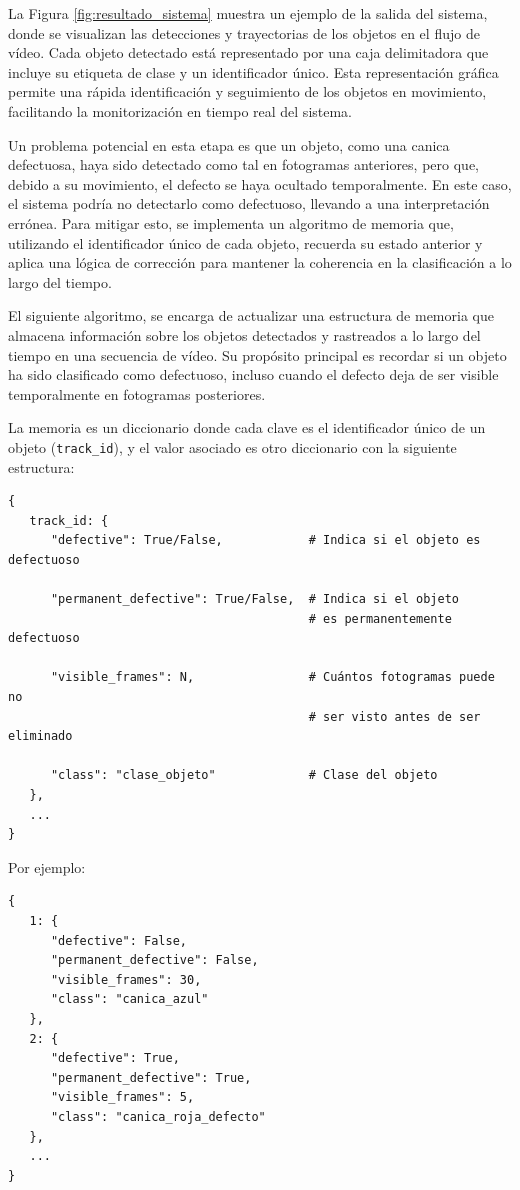 \documentclass[11pt,spanish,listoffigures,listoftables]{tfgetsinf}
\begin{document}
La Figura \ref{fig:resultado_sistema} muestra un ejemplo de la salida del sistema, donde se visualizan las detecciones y trayectorias de los objetos en el flujo de vídeo. Cada objeto detectado está representado por una caja delimitadora que incluye su etiqueta de clase y un identificador único. Esta representación gráfica permite una rápida identificación y seguimiento de los objetos en movimiento, facilitando la monitorización en tiempo real del sistema.

Un problema potencial en esta etapa es que un objeto, como una canica defectuosa, haya sido detectado como tal en fotogramas anteriores, pero que, debido a su movimiento, el defecto se haya ocultado temporalmente. En este caso, el sistema podría no detectarlo como defectuoso, llevando a una interpretación errónea. Para mitigar esto, se implementa un algoritmo de memoria que, utilizando el identificador único de cada objeto, recuerda su estado anterior y aplica una lógica de corrección para mantener la coherencia en la clasificación a lo largo del tiempo.

El siguiente algoritmo, se encarga de actualizar una estructura de memoria que almacena información sobre los objetos detectados y rastreados a lo largo del tiempo en una secuencia de vídeo. Su propósito principal es recordar si un objeto ha sido clasificado como defectuoso, incluso cuando el defecto deja de ser visible temporalmente en fotogramas posteriores.


La memoria es un diccionario donde cada clave es el identificador único de un objeto (\texttt{track\_id}), y el valor asociado es otro diccionario con la siguiente estructura:

\begin{verbatim}
{
   track_id: {
      "defective": True/False,            # Indica si el objeto es defectuoso

      "permanent_defective": True/False,  # Indica si el objeto 
                                          # es permanentemente defectuoso

      "visible_frames": N,                # Cuántos fotogramas puede no 
                                          # ser visto antes de ser eliminado

      "class": "clase_objeto"             # Clase del objeto
   },
   ...
}
\end{verbatim}

Por ejemplo:
\begin{verbatim}
{
   1: {
      "defective": False,
      "permanent_defective": False,
      "visible_frames": 30,
      "class": "canica_azul"
   },
   2: {
      "defective": True,
      "permanent_defective": True,
      "visible_frames": 5,
      "class": "canica_roja_defecto"
   },
   ...
}
\end{verbatim}
\end{document}
